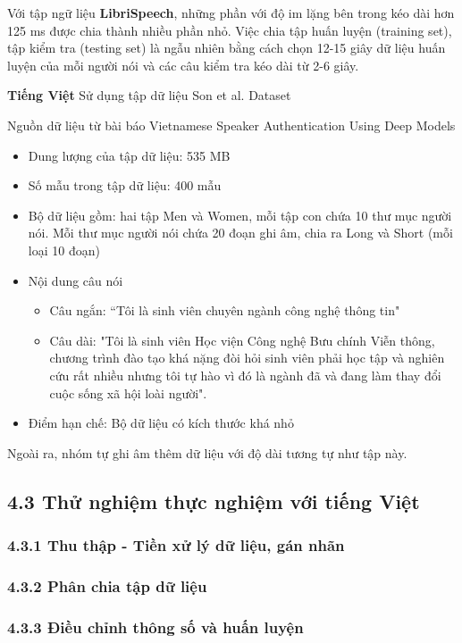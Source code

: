 \documentclass{article}
\begin{document}
	Với tập ngữ liệu \textbf{LibriSpeech}, những phần với độ im lặng bên trong kéo dài hơn 125 ms được chia thành nhiều phần nhỏ. Việc chia tập huấn luyện (training set), tập kiểm tra (testing set) là ngẫu nhiên bằng cách chọn 12-15 giây dữ liệu huấn luyện của mỗi người nói và các câu kiểm tra kéo dài từ 2-6 giây. 
	
	\textbf{Tiếng Việt} Sử dụng tập dữ liệu Son et al. Dataset
	
	Nguồn dữ liệu từ bài báo Vietnamese Speaker Authentication Using Deep Models
	\begin{itemize}
		\item Dung lượng của tập dữ liệu: 535 MB
		\item Số mẫu trong tập dữ liệu: 400 mẫu
		\item Bộ dữ liệu gồm: hai tập  Men và Women, mỗi tập con chứa 10 thư mục người nói. Mỗi thư mục người nói chứa 20 đoạn ghi âm, chia ra Long và Short (mỗi loại 10 đoạn) 
		\item Nội dung câu nói
		\begin{itemize}
			\item Câu ngắn: “Tôi là sinh viên chuyên ngành công nghệ thông tin"
			\item Câu dài: "Tôi là sinh viên Học viện Công nghệ Bưu chính Viễn thông, chương trình đào tạo khá nặng đòi hỏi sinh viên phải học tập và nghiên cứu rất nhiều nhưng tôi tự hào vì đó là ngành đã và đang làm thay đổi cuộc sống xã hội loài người".
		\end{itemize}
		\item Điểm hạn chế: Bộ dữ liệu có kích thước khá nhỏ
	\end{itemize}
	
	Ngoài ra, nhóm tự ghi âm thêm dữ liệu với độ dài tương tự như tập này.
	\subsection{4.3 Thử nghiệm thực nghiệm với tiếng Việt}
	\subsubsection{4.3.1 Thu thập - Tiền xử lý dữ liệu, gán nhãn}
	
	\subsubsection{4.3.2 Phân chia tập dữ liệu}
	
	\subsubsection{4.3.3 Điều chỉnh thông số và huấn luyện}
	
\end{document}
